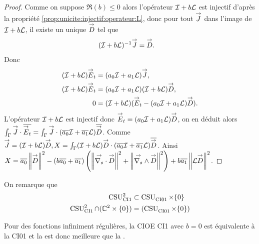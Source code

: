     \begin{proof}
      Comme on suppose \(\Re(b)\le 0\) alors l'opérateur \(\oI + b\LL\) est injectif d'après la propriété \ref{prop:unicite:injectif:operateur:L}, donc pour tout \(\vJ\) dans l'image de \(\oI + b\LL\), il existe un unique \(\vect{D}\) tel que
      \begin{align*}
        (\oI + b \LL)^{-1}\vJ &= \vect{D}.
      \end{align*}
      Donc 
      \begin{align*}
        (\oI + b \LL)\vE_t &= (a_0\oI + a_1\LL)\vJ,
        \\
        (\oI + b \LL)\vE_t &= (a_0\oI + a_1\LL)(\oI + b \LL)\vect{D},
        \\
        0 &= (\oI + b \LL)(\vE_t -  (a_0\oI + a_1\LL)\vect{D}).
      \end{align*}
      L'opérateur \(\oI + b \LL\) est injectif donc \(\vE_t = (a_0\oI + a_1\LL)\vect{D}\), on en déduit alors \(\int_\Gamma \vJ \cdot \conj{\vE_t} = \int_\Gamma \vJ \cdot (\conj{a_0}\oI + \conj{a_1}\LL)\conj{\vect{D}}\).
      Comme \(\vJ = (\oI + b \LL)\vect{D}, X = \int_\Gamma (\oI + b \LL)\vect{D} \cdot (\conj{a_0}\oI + \conj{a_1}\LL)\conj{\vect{D}}\).
      Ainsi \( X = \conj{a_0}\norm{\vect{D}}^2 - (b\conj{a_0}+\conj{a_1})\left(\norm{\vdivs{\vect{D}}}^2+\norm{\vrots{\vect{D}}}^2\right) + b\conj{a_1} \norm{\LL\vect{D}}^2\).
    \end{proof}

    On remarque que
    \begin{align}
      \CSU[2]{CI1} & \subset \CSU{CI01}\times\lbrace0\rbrace
      \\
      \CSU[2]{CI1}\cap(\CC^2 \times \lbrace0\rbrace) &= (\CSU{CI01}\times\lbrace0\rbrace)
    \end{align}

    Pour des fonctions infiniment régulières, la CIOE CI1 avec \(b=0\) est équivalente à la CI01 et la  est donc meilleure que la  .
